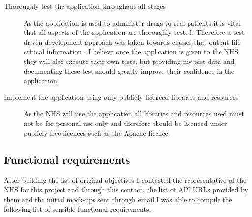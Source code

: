 \begin{description}
	\item[Thoroughly test the application throughout all stages] As the application is used to administer drugs to real patients it is vital that all aspects of the application are thoroughly tested. Therefore a test-driven development approach was taken towards classes that output life critical information \cite{tdd}. I believe once the application is given to the NHS they will also execute their own tests, but providing my test data and documenting these test should greatly improve their confidence in the application.
	\item[Implement the application using only publicly licenced libraries and resources] As the NHS will use the application all libraries and resources used must not be for personal use only and therefore should be licenced under publicly free licences such as the Apache licence.
\end{description}

\subsection{Functional requirements}

After building the list of original objectives I contacted the representative of the NHS for this project and through this contact, the list of API URLs provided by them and the initial mock-ups sent through email I was able to compile the following list of sensible functional requirements.

